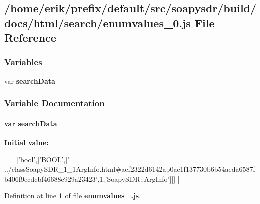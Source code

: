 \subsection{/home/erik/prefix/default/src/soapysdr/build/docs/html/search/enumvalues\+\_\+0.js File Reference}
\label{enumvalues__0_8js}
\subsubsection*{Variables}
\begin{DoxyCompactItemize}
\item 
var {\bf search\+Data}
\end{DoxyCompactItemize}


\subsubsection{Variable Documentation}
\paragraph[{search\+Data}]{\setlength{\rightskip}{0pt plus 5cm}var search\+Data}\label{enumvalues__0_8js_ad01a7523f103d6242ef9b0451861231e}
{\bfseries Initial value\+:}
\begin{DoxyCode}
=
[
  [\textcolor{stringliteral}{'bool'},[\textcolor{stringliteral}{'BOOL'},[\textcolor{stringliteral}{'
      ../classSoapySDR\_1\_1ArgInfo.html#acf2322d6142ab0ae1f137730b6b54aeda6587fb406f9ecdcbf46688e929a23423'},1,\textcolor{stringliteral}{'SoapySDR::ArgInfo'}]]]
]
\end{DoxyCode}


Definition at line {\bf 1} of file {\bf enumvalues\+\_.\+js}.

